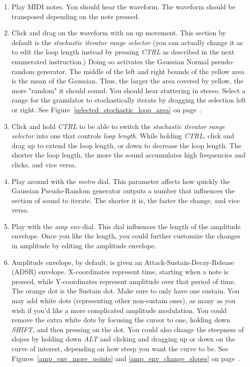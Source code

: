 \documentclass{article}
\begin{document}
\begin{enumerate}
				\item Play MIDI notes. You should hear the waveform. The waveform should be transposed depending on the note pressed.  

				\item Click and drag on the waveform with an up movement. This section by default is the \emph{stochastic iterator range selector} (you can actually change it as to edit the loop length instead by pressing \emph{CTRL} as described in the next enumerated instruction.) Doing so activates the Gaussian Normal pseudo-random generator. The middle of the left and right bounds of the yellow area is the mean of the Gaussian. Thus, the larger the area covered by yellow, the more "random" it should sound.  You should hear stuttering in stereo.  Select a range for the granulator to stochastically iterate by dragging the selection left or right. See Figure~\ref{selected_stochastic_loop_area} on page~\pageref{selected_stochastic_loop_area}.

				\item Click and hold \emph{CTRL} to be able to switch the \emph{stochastic iterator range selector} into one that controls \emph{loop length}. While holding \emph{CTRL}, click and drag up to extend the loop length, or down to decrease the loop length. The shorter the loop length, the more the sound accumulates high frequencies and clicks, and vice versa.

				\item Play around with the \emph{metro} dial.  This parameter affects how quickly the Gaussian Pseudo-Random generator outputs a number that influences the section of sound to iterate.  The shorter it is, the faster the change, and vice versa.

				\item Play with the \emph{amp env} dial. This dial influences the length of the amplitude envelope.  Once you like the length, you could further customize the changes in amplitude by editing the amplitude envelope.  

				\item Amplitude envelope, by default, is given an Attack-Sustain-Decay-Release (ADSR) envelope. X-coordinates represent time, starting when a note is pressed, while Y-coordinates represent amplitude over that period of time.  The orange dot is the Sustain dot.  Make sure to only have one sustain.  You may add white dots (representing other non-sustain ones), as many as you wish if you'd like a more complicated amplitude modulation. You could remove the extra white dots by focusing the cursor to one, holding down \emph{SHIFT}, and then pressing on the dot.  You could also change the steepness of slopes by holding down \emph{ALT} and clicking and dragging up or down on the curve of interest, depending on how steep you want the curve to be.  See Figures~\ref{amp_env_more_points} and \ref{amp_env_change_slopes} on page~\pageref{editing amplitude envelope}.


\end{enumerate}
\end{document}
